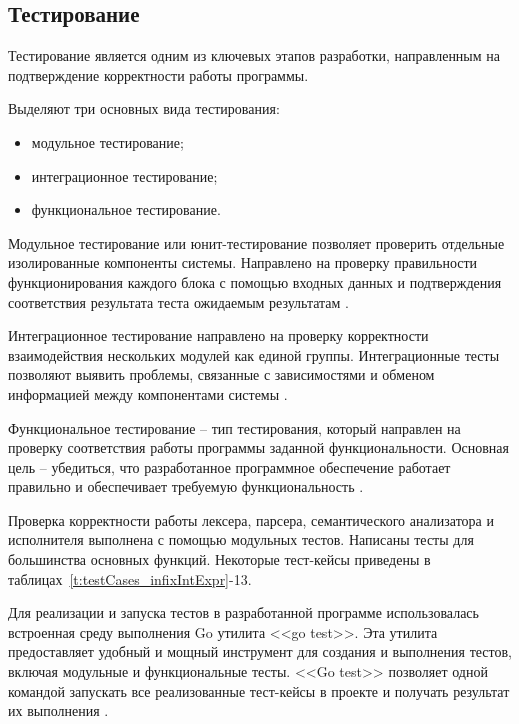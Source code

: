 \subsection{Тестирование}

Тестирование является одним из ключевых этапов разработки, направленным на подтверждение корректности работы программы.

Выделяют три основных вида тестирования:
\begin{itemize}
    \item модульное тестирование;
    \item интеграционное тестирование;
    \item функциональное тестирование.
\end{itemize}

Модульное тестирование или юнит-тестирование позволяет проверить отдельные изолированные компоненты системы.
Направлено на проверку правильности функционирования каждого блока с помощью входных данных и подтверждения соответствия результата теста ожидаемым результатам .

Интеграционное тестирование направлено на проверку корректности взаимодействия нескольких модулей как единой группы.
Интеграционные тесты позволяют выявить проблемы, связанные с зависимостями и обменом информацией между компонентами системы .

Функциональное тестирование -- тип тестирования, который направлен на проверку соответствия работы программы заданной функциональности.
Основная цель -- убедиться, что разработанное программное обеспечение работает правильно и обеспечивает требуемую функциональность .

Проверка корректности работы лексера, парсера, семантического анализатора и исполнителя выполнена с помощью модульных тестов.
Написаны тесты для большинства основных функций.
Некоторые тест-кейсы приведены в таблицах~\ref{t:testCases_infixIntExpr}-13.

Для реализации и запуска тестов в разработанной программе использовалась встроенная среду выполнения Go утилита <<go test>>.
Эта утилита предоставляет удобный и мощный инструмент для создания и выполнения тестов, включая модульные и функциональные тесты.
<<Go test>> позволяет одной командой запускать все реализованные тест-кейсы в проекте и получать результат их выполнения .


